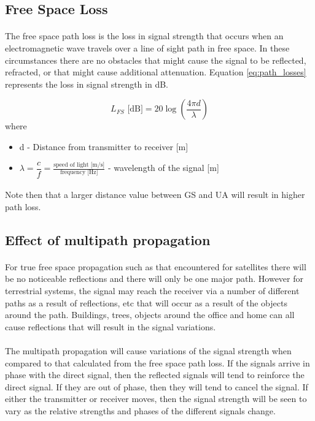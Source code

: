\subsection{Free Space Loss}\label{subsec:path_loss}
\paragraph{}
The free space path loss is the loss in signal strength that occurs when an electromagnetic wave travels over a line of sight path in free space. In these circumstances there are no obstacles that might cause the signal to be reflected, refracted, or that might cause additional attenuation. Equation \ref{eq:path_losses} represents the loss in signal strength in dB.

\begin{equation}\label{eq:path_losses}
	L_{FS}\text{ [dB]} = 20\log\left (\frac{4\pi d}{\lambda} \right)
\end{equation}
where
\begin{itemize}
	\item d - Distance from transmitter to receiver [m]
	\item $\lambda  = \dfrac{c}{f} = \frac{\text{speed of light [m/s]}}{\text{frequency [Hz]}}$ - wavelength of the signal [m]
\end{itemize}

\paragraph{} Note then that a larger distance value between GS and UA will result in higher path loss.

\subsection*{Effect of multipath propagation}
\paragraph{}For true free space propagation such as that encountered for satellites there will be no noticeable reflections and there will only be one major path. However for terrestrial systems, the signal may reach the receiver via a number of different paths as a result of reflections, etc that will occur as a result of the objects around the path. Buildings, trees, objects around the office and home can all cause reflections that will result in the signal variations.

\paragraph{}The multipath propagation will cause variations of the signal strength when compared to that calculated from the free space path loss. If the signals arrive in phase with the direct signal, then the reflected signals will tend to reinforce the direct signal. If they are out of phase, then they will tend to cancel the signal. If either the transmitter or receiver moves, then the signal strength will be seen to vary as the relative strengths and phases of the different signals change.